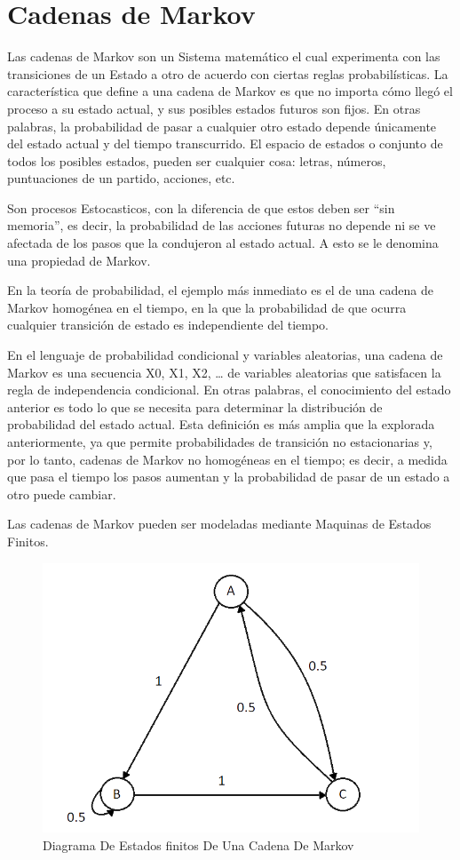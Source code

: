 \documentclass[12pt, a4paper, titlepage]{report}
\begin{document}
		\section{Cadenas de Markov}
	    Las cadenas de Markov son un \Gls{Sistema} matemático el cual experimenta con las transiciones de un \Gls{Estado} a otro de acuerdo con ciertas reglas probabilísticas. La característica que define a una cadena de Markov es que no importa cómo llegó el proceso a su estado actual, y sus posibles estados futuros son fijos. En otras palabras, la probabilidad de pasar a cualquier otro estado depende únicamente del estado actual y del tiempo transcurrido. El espacio de estados o conjunto de todos los posibles estados, pueden ser cualquier cosa: letras, números, puntuaciones de un partido, acciones, etc.\par
		Son procesos \Gls{Estocastico}s, con la diferencia de que estos deben ser “sin memoria”, es decir, la probabilidad de las acciones futuras no depende ni se ve afectada de los pasos que la condujeron al estado actual. A esto se le denomina una propiedad de Markov.\par
		En la teoría de probabilidad, el ejemplo más inmediato es el de una cadena de Markov homogénea en el tiempo, en la que la probabilidad de que ocurra cualquier transición de estado es independiente del tiempo.\par
		En el lenguaje de probabilidad condicional y variables aleatorias, una cadena de Markov es una secuencia X0, X1, X2, … de variables aleatorias que satisfacen la regla de independencia condicional.
		En otras palabras, el conocimiento del estado anterior es todo lo que se necesita para determinar la distribución de probabilidad del estado actual. Esta definición es más amplia que la explorada anteriormente, ya que permite probabilidades de transición no estacionarias y, por lo tanto, cadenas de Markov no homogéneas en el tiempo; es decir, a medida que pasa el tiempo los pasos aumentan y la probabilidad de pasar de un estado a otro puede cambiar. \cite{refMarkov}\par
		Las cadenas de Markov pueden ser modeladas mediante \Gls{Maquinas de Estados Finitos}.\par
		\begin{figure}[H]
			\includegraphics[width=12cm]{./imagenes/MarcoTeorico/Markov/CMarkov.png}
			\centering 
			\caption{Diagrama De Estados finitos De Una Cadena De Markov}
		\end{figure}
\end{document}
